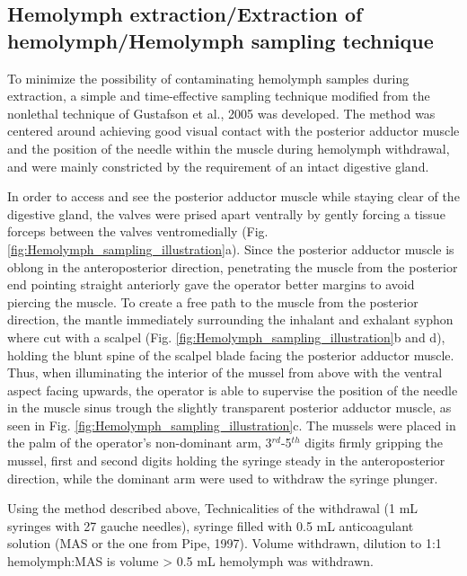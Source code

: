 \subsection{Hemolymph extraction/Extraction of hemolymph/Hemolymph sampling technique}
To minimize the possibility of contaminating hemolymph samples during extraction, a simple and time-effective sampling technique modified from the nonlethal technique of Gustafson et al., 2005 was developed. The method was centered around achieving good visual contact with the posterior adductor muscle and the position of the needle within the muscle during hemolymph withdrawal, and were mainly constricted by the requirement of an intact digestive gland.

In order to access and see the posterior adductor muscle while staying clear of the digestive gland, the valves were prised apart ventrally by gently forcing a tissue forceps between the valves ventromedially (Fig. \ref{fig:Hemolymph_sampling_illustration}a). Since the posterior adductor muscle is oblong in the anteroposterior direction, penetrating the muscle from the posterior end pointing straight anteriorly gave the operator better margins to avoid piercing the muscle. To create a free path to the muscle from the posterior direction, the mantle immediately surrounding the inhalant and exhalant syphon where cut with a scalpel (Fig. \ref{fig:Hemolymph_sampling_illustration}b and d), holding the blunt spine of the scalpel blade facing the posterior adductor muscle.  Thus, when illuminating the interior of the mussel from above with the ventral aspect facing upwards, the operator is able to supervise the position of the needle in the muscle sinus trough the slightly transparent posterior adductor muscle, as seen in Fig. \ref{fig:Hemolymph_sampling_illustration}c. The mussels were placed in the palm of the operator's non-dominant arm, 3$^{rd}$-5$^{th}$ digits firmly gripping the mussel, first and second digits holding the syringe steady in the anteroposterior direction, while the dominant arm were used to withdraw the syringe plunger.

Using the method described above, Technicalities of the withdrawal (1 mL syringes with 27 gauche needles), syringe filled with 0.5 mL anticoagulant solution (MAS or the one from Pipe, 1997). Volume withdrawn, dilution to 1:1 hemolymph:MAS is volume > 0.5 mL hemolymph was withdrawn.



